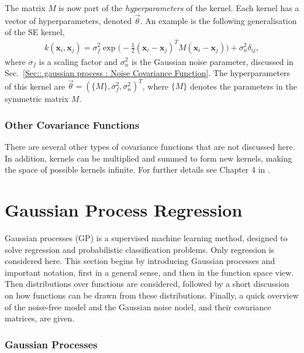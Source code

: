 \documentclass[twoside,english]{uiofysmaster}
\begin{document}
The matrix $M$ is now part of the \textit{hyperparameters} of the kernel. Each kernel has a vector of hyperparameters, denoted $\vec{\theta}$. An example is the following generalisation of the SE kernel, 
\begin{align}
k(\textbf{x}_i, \textbf{x}_j) = \sigma_f^2 \exp \big(- \frac{1}{2} (\textbf{x}_i - \textbf{x}_j)^T M (\textbf{x}_i - \textbf{x}_j) \big) + \sigma_n^2 \delta_{ij},
\end{align}
where $\sigma_f$ is a scaling factor and $\sigma_n^2$ is the Gaussian noise parameter, discussed in Sec.~\ref{Sec:: gaussian process : Noise Covariance Function}. The hyperparameters of this kernel are $\vec{\theta} = (\{M\}, \sigma^2_f, \sigma_n^2)^T$, where $\{M\}$ denotes the parameters in the symmetric matrix $M$. 

\subsubsection{Other Covariance Functions}

There are several other types of covariance functions that are not discussed here. In addition, kernels can be multiplied and summed to form new kernels, making the space of possible kernels infinite. For further details see Chapter 4 in \cite{rasmussen2006gaussian}.




\section{Gaussian Process Regression}\label{Sec: gaussian process : Gaussian Process Regression}

Gaussian processes (GP) is a supervised machine learning method, designed to solve regression and probabilistic classification problems. Only regression is considered here. This section begins by introducing Gaussian processes and important notation, first in a general sense, and then in the function space view. Then distributions over functions are considered, followed by a short discussion on how functions can be drawn from these distributions. Finally, a quick overview of the noise-free model and the Gaussian noise nodel, and their covariance matrices, are given.

\subsubsection{Gaussian Processes}\label{Sec:: gaussian process : Gaussian Processes}
\end{document}
